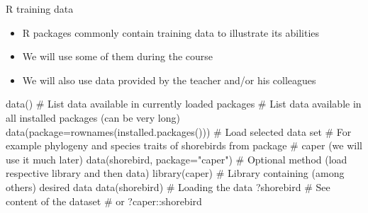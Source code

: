 \documentclass[compress, ucs, xelatex, 11pt, xcolor=svgnames,
  hyperref={
    bookmarks=true,
    unicode=true,
    colorlinks=true,
    pdftitle={Molecular data in R},
    plainpages=false,
    pdfauthor={Vojtech Zeisek},
    pdfsubject={Course about phylogeny and evolution in R},
    pdfcreator={XeLaTeX},
    pdfkeywords={R, evolution, phylogeny, molecular data},
    linkcolor=Tomato,
    anchorcolor=SaddleBrown,
    citecolor=Goldenrod,
    filecolor=DarkMagenta,
    menucolor=Sienna,
    urlcolor=DarkTurquoise,
    pdftex},
  url={hyphens, lowtilde} %
  ]{beamer}
\begin{document}
\begin{frame}[fragile]{R training data}
  \begin{itemize}
    \item R packages commonly contain training data to illustrate its abilities
    \item We will use some of them during the course
    \item We will also use data provided by the teacher and/or his colleagues
  \end{itemize}
  \begin{spluscode}
    data() # List data available in currently loaded packages
    # List data available in all installed packages (can be very long)
    data(package=rownames(installed.packages()))
    # Load selected data set
    # For example phylogeny and species traits of shorebirds from package
    # caper (we will use it much later)
    data(shorebird, package="caper")
    # Optional method (load respective library and then data)
    library(caper) # Library containing (among others) desired data
    data(shorebird) # Loading the data
    ?shorebird # See content of the dataset # or
    ?caper::shorebird
  \end{spluscode}
\end{frame}
\end{document}
